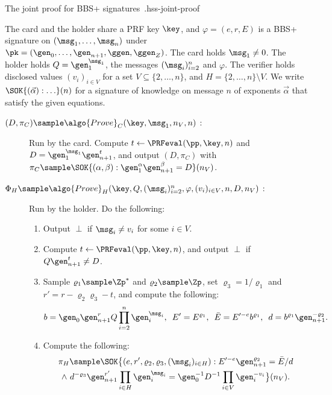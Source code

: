\begin{primitivebox}[breakable]{The joint proof for BBS+ signatures~\cite{USENIX:HesSinSor23}.}{hss-joint-proof}

  The card and the holder share a PRF key $\key$, and $\varphi = (e, r, E)$ is a
BBS+ signature on $(\msg_1, \ldots, \msg_n)$ under $\pk = (\gen_0, \ldots,
\gen_{n+1}, \ggen, \ggen_Z)$. The card holds $\msg_1 \neq 0$. The holder holds
$Q = \gen_1^{\msg_1}$, the messages $(\msg_i)_{i=2}^{n}$ and $\varphi$. The
verifier holds disclosed values $(v_i)_{i \in V}$ for a set $V \subseteq \{2,
\ldots, n\}$, and $H = \{2, \ldots, n\} \setminus V$. We write
$\SOK\{(\vec{\alpha}) : \ldots\}(n)$ for a signature of knowledge on message $n$ of
exponents $\vec{\alpha}$ that satisfy the given equations.

  \begin{description}

    \item[$(D, \pi_C) \sample \algo{Prove}_C(\key, \msg_1, n_V, n)$ :] Run by
the card. Compute $t \leftarrow \PRFeval(\pp, \key, n)$ and $D =
\gen_1^{\msg_1} \gen_{n+1}^{t}$, and output $(D, \pi_C)$ with $\pi_C \sample
\SOK\{(\alpha, \beta) : \gen_1^{\alpha} \gen_{n+1}^{\beta} = D\}(n_V)$.

    \item[$\Phi_H \sample \algo{Prove}_H(\key, Q, (\msg_i)_{i=2}^{n}, \varphi,
(v_i)_{i \in V}, n, D, n_V)$ :] Run by the holder. Do the following:

      \begin{enumerate}

	\item Output $\perp$ if $\msg_i \neq v_i$ for some $i \in V$.

	\item Compute $t \leftarrow \PRFeval(\pp, \key, n)$, and output $\perp$ if
$Q \gen_{n+1}^{t} \neq D$.

	\item Sample $\varrho_1 \sample \Zp^*$ and $\varrho_2 \sample \Zp$, set
$\varrho_3 = 1/\varrho_1$ and $r' = r - \varrho_2 \varrho_3 - t$, and compute
the following:
          \begin{equation*}
            b = \gen_0 \gen_{n+1}^{r} Q \prod_{i=2}^{n} \gen_i^{\msg_i}, \enskip
E' = E^{\varrho_1}, \enskip \bar{E} = E'^{-e} b^{\varrho_1}, \enskip d =
b^{\varrho_1} \gen_{n+1}^{-\varrho_2}.
          \end{equation*}

	\item Compute the following:
          \begin{multline*}
            \pi_H \sample \SOK\bigl\{(e, r', \varrho_2, \varrho_3, (\msg_i)_{i
\in H}) : E'^{-e} \gen_{n+1}^{\varrho_2} = \bar{E}/d \\
            \wedge\ d^{-\varrho_3} \gen_{n+1}^{r'} \prod_{i \in H}
\gen_i^{\msg_i} = \gen_0^{-1} D^{-1} \prod_{i \in V} \gen_i^{-v_i}\bigr\}(n_V).
          \end{multline*}


\end{enumerate}
\end{description}
\end{primitivebox}
